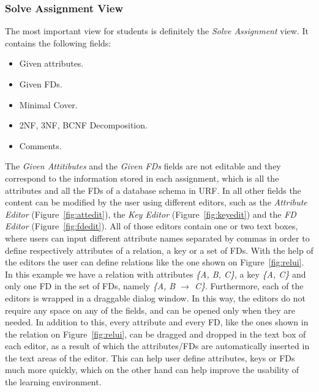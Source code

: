 \subsubsection{Solve Assignment View}
The most important view for students is definitely the \textit{Solve Assignment} view.
It contains the following fields:

\begin{itemize}
	\item Given attributes.
	\item Given FDs.
	\item Minimal Cover.
	\item 2NF, 3NF, BCNF Decomposition.
	\item Comments.
\end{itemize}

The \textit{Given Attitibutes} and the \textit{Given FDs} fields are not editable
and they correspond	to the information stored in each assignment, which is all the 
attributes and all the FDs of a database schema in URF. In all other fields 
the content can be modified by the user using different editors,
such as the \textit{Attribute Editor} (Figure~\ref{fig:attedit}), 
the \textit{Key Editor} (Figure~\ref{fig:keyedit}) and the \textit{FD Editor}
(Figure~\ref{fig:fdedit}).
All of those editors contain one or two text boxes, where users can input 
different attribute names separated by commas
in order to define respectively attributes of a relation, a key or a set of FDs. With
the help of the editors the user can define relations like the one shown on 
Figure~\ref{fig:relui}. In this example we have a relation with attributes 
\textit{\{A, B, C\}}, a key \textit{\{A, C\}} and only one FD in the set of FDs,
namely \textit{\{A, B $\rightarrow$ C\}}.  Furthermore,
each of the editors is wrapped in a draggable dialog window. 
In this way, the editors do not require any space on any of the fields, 
and can be opened only when they are needed. In addition to this, every attribute and every FD,
like the ones shown in the relation on Figure~\ref{fig:relui}, can be dragged and
dropped in the text box of each editor, as a result of which the attributes/FDs
are automatically inserted in the text areas of the editor.
This can help user define attributes, keys or
FDs much more quickly, which on the other hand can help improve the usability of 
the learning environment. 

